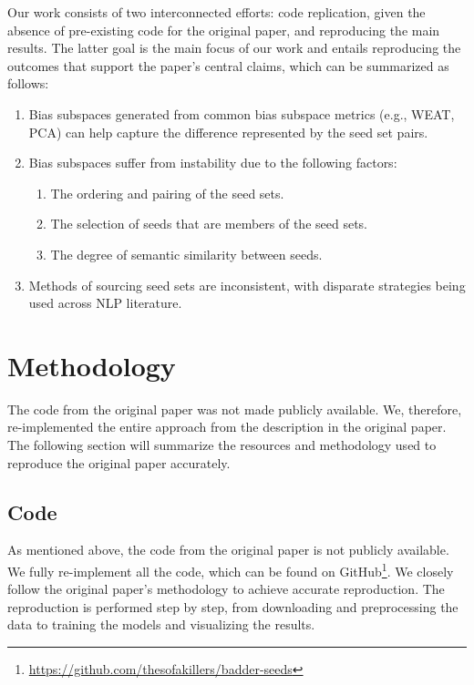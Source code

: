 Our work consists of two interconnected efforts: code replication, given the absence of pre-existing code for the original paper, and reproducing the main results. The latter goal is the main focus of our work and entails reproducing the outcomes that support the paper's central claims, which can be summarized as follows:

\begin{enumerate}
	\item Bias subspaces generated from common bias subspace metrics (e.g., WEAT, PCA) can help capture the difference represented by the seed set pairs.\label{claim:subspace}
	\item Bias subspaces suffer from instability due to the following factors:
	      \begin{enumerate}\label{claim:instability}
		      \item The ordering and pairing of the seed sets.\label{claim:instability:ordering}
		      \item The selection of seeds that are members of the seed sets.\label{claim:instability:choice}
		      \item The degree of semantic similarity between seeds. \label{claim:instability:semantic}
	      \end{enumerate}
	\item Methods of sourcing seed sets are inconsistent, with disparate strategies being used across NLP literature. \label{claim:sources}
\end{enumerate}

\section{Methodology}

The code from the original paper was not made publicly available. We, therefore, re-implemented the
entire approach from the description in the original paper. The following section will summarize the
resources and methodology used to reproduce the original paper accurately.

\subsection{Code}

As mentioned above, the code from the original paper is not publicly available. We fully
re-implement all the code, which can be found on
GitHub\footnote{\href{https://github.com/thesofakillers/badder-seeds}{https://github.com/thesofakillers/badder-seeds}}.
We closely follow the original paper's methodology to achieve accurate reproduction. The
reproduction is performed step by step, from downloading and preprocessing the data to training the
models and visualizing the results.

